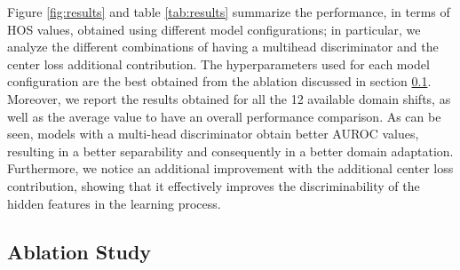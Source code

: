 \documentclass[10pt,twocolumn,letterpaper]{article}
\begin{document}
Figure \ref{fig:results} and table \ref{tab:results} summarize the performance, in terms of HOS values,
obtained using different model configurations; in particular, we analyze the different combinations
of having a multihead discriminator and the center loss additional contribution.
The hyperparameters used for each model configuration are the best obtained from the ablation
discussed in section \ref{sec:ablation_study}.
Moreover, we report the results obtained for all the 12 available domain shifts,
as well as the average value to have an overall performance comparison.
As can be seen, models with a multi-head discriminator obtain better AUROC values,
resulting in a better separability and consequently in a better domain adaptation.
Furthermore, we notice an additional improvement with the additional center loss contribution,
showing that it effectively improves the discriminability of the hidden features in the learning process.

\subsection{Ablation Study}
\label{sec:ablation_study}
\end{document}

